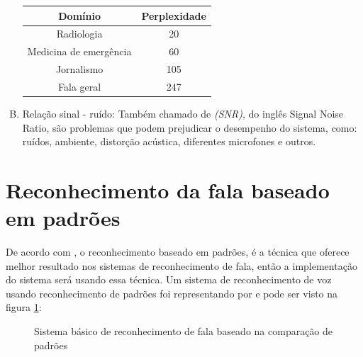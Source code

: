 \begin{enumerate}[A)]
\begin{table}[H]
\begin{tabular}{cc}
\hline %

Domínio & Perplexidade \\ %

\hline
\hline

Radiologia & 20 \\
Medicina de emergência & 60 \\
Jornalismo & 105 \\
Fala geral & 247 \\ 
\hline
\end{tabular}
\label{tab}
\end{table}

\item Relação sinal - ruído:
Também chamado de \textit{(SNR)}, do inglês Signal Noise Ratio, são problemas que podem prejudicar o desempenho do sistema, como: ruídos, ambiente, distorção acústica, diferentes microfones e outros.


\end{enumerate}

\section{Reconhecimento da fala baseado em padrões}\label{sec:red_neu}
De acordo com , o reconhecimento baseado em padrões, é a técnica que oferece melhor resultado nos sistemas de reconhecimento de fala, então a implementação do sistema será usando essa técnica.
Um sistema de reconhecimento de voz usando reconhecimento de padrões foi representando por  e pode ser visto na figura \ref{figRecPad}:
 
\begin{figure}[H]
\centering

\caption{Sistema básico de reconhecimento de fala baseado na comparação de padrões}
\label{figRecPad}
\end{figure}

